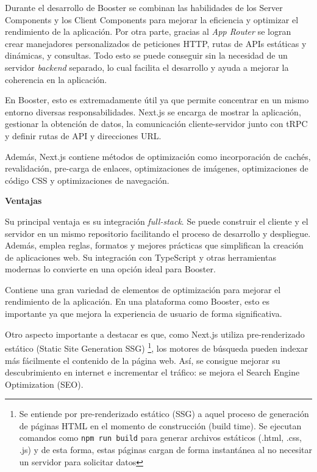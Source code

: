 Durante el desarrollo de Booster se combinan las habilidades de los Server Components y los Client Components para mejorar la eficiencia y optimizar el rendimiento de la aplicación. Por otra parte, gracias al \textit{App Router} \cite{nextjs-app} se logran crear manejadores personalizados de peticiones HTTP, rutas de APIs estáticas y dinámicas, y consultas. Todo esto se puede conseguir sin la necesidad de un servidor \textit{backend} separado, lo cual facilita el desarrollo y ayuda a mejorar la coherencia en la aplicación.

En Booster, esto es extremadamente útil ya que permite concentrar en un mismo entorno diversas responsabilidades. Next.js se encarga de mostrar la aplicación, gestionar la obtención de datos, la comunicación cliente-servidor junto con tRPC y definir rutas de API y direcciones URL.

Además, Next.js contiene métodos de optimización como incorporación de cachés, revalidación, pre-carga de enlaces, optimizaciones de imágenes, optimizaciones de código CSS y optimizaciones de navegación.

\textbf{Ventajas}

Su principal ventaja es su integración \textit{full-stack}. Se puede construir el cliente y el servidor en un mismo repositorio facilitando el proceso de desarrollo y despliegue. Además, emplea reglas, formatos y mejores prácticas que simplifican  la creación de aplicaciones web. Su integración con TypeScript y otras herramientas modernas lo convierte en una opción ideal para Booster. 

Contiene una gran variedad de elementos de optimización para mejorar el rendimiento de la aplicación. En una plataforma como Booster, esto es importante ya que mejora la experiencia de usuario de forma significativa. 

Otro aspecto importante a destacar es que, como Next.js utiliza pre-renderizado estático (Static Site Generation SSG) \footnote{Se entiende por pre-renderizado estático (SSG) a aquel proceso de generación de páginas HTML en el momento de construcción (build time). Se ejecutan comandos como \lstinline|npm run build| para generar archivos estáticos (.html, .css, .js) y de esta forma, estas páginas cargan de forma instantánea al no necesitar un servidor para solicitar datos}, los motores de búsqueda pueden indexar más fácilmente el contenido de la página web. Así, se consigue mejorar su descubrimiento en internet e incrementar el tráfico: se mejora el Search Engine Optimization (SEO).


